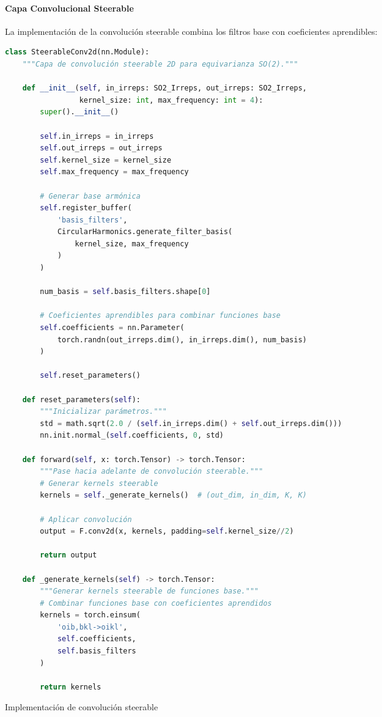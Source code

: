 \paragraph{Capa Convolucional Steerable}

La implementación de la convolución steerable combina los filtros base con coeficientes aprendibles:

\begin{listing}[h]
\begin{lstlisting}[language=Python]
class SteerableConv2d(nn.Module):
    """Capa de convolución steerable 2D para equivarianza SO(2)."""
    
    def __init__(self, in_irreps: SO2_Irreps, out_irreps: SO2_Irreps, 
                 kernel_size: int, max_frequency: int = 4):
        super().__init__()
        
        self.in_irreps = in_irreps
        self.out_irreps = out_irreps
        self.kernel_size = kernel_size
        self.max_frequency = max_frequency
        
        # Generar base armónica
        self.register_buffer(
            'basis_filters',
            CircularHarmonics.generate_filter_basis(
                kernel_size, max_frequency
            )
        )
        
        num_basis = self.basis_filters.shape[0]
        
        # Coeficientes aprendibles para combinar funciones base
        self.coefficients = nn.Parameter(
            torch.randn(out_irreps.dim(), in_irreps.dim(), num_basis)
        )
        
        self.reset_parameters()
    
    def reset_parameters(self):
        """Inicializar parámetros."""
        std = math.sqrt(2.0 / (self.in_irreps.dim() + self.out_irreps.dim()))
        nn.init.normal_(self.coefficients, 0, std)
    
    def forward(self, x: torch.Tensor) -> torch.Tensor:
        """Pase hacia adelante de convolución steerable."""
        # Generar kernels steerable
        kernels = self._generate_kernels()  # (out_dim, in_dim, K, K)
        
        # Aplicar convolución
        output = F.conv2d(x, kernels, padding=self.kernel_size//2)
        
        return output
    
    def _generate_kernels(self) -> torch.Tensor:
        """Generar kernels steerable de funciones base."""
        # Combinar funciones base con coeficientes aprendidos
        kernels = torch.einsum(
            'oib,bkl->oikl',
            self.coefficients,
            self.basis_filters
        )
        
        return kernels
\end{lstlisting}
\caption{Implementación de convolución steerable}
\label{code:steerable_conv}
\end{listing}

